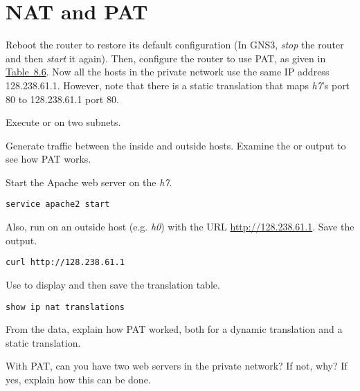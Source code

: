 \documentclass{../UTNetLab}
\begin{document}
\section{NAT and PAT}
Reboot the router to restore its default configuration (In GNS3, \textit{stop} the router and then \textit{start} it again).
Then, configure the router to use PAT, as given in \hyperref[tab:8.6]{Table~8.6}.
Now all the hosts in the private network use the same IP address 128.238.61.1.
However, note that there is a static translation that maps \textit{h7}’s port 80 to 128.238.61.1 port 80.

Execute  or  on two subnets.

Generate traffic between the inside and outside hosts.
Examine the  or  output to see how PAT works.

Start the Apache web server on the \textit{h7}.

\begin{lstlisting}
service apache2 start
\end{lstlisting}

Also, run  on an outside host (e.g. \textit{h0}) with the URL \url{http://128.238.61.1}.
Save the  output.

\begin{lstlisting}
curl http://128.238.61.1
\end{lstlisting}

Use  to display and then save the translation table.

\begin{lstlisting}[language=cisco, frame=trBL]
show ip nat translations
\end{lstlisting}

\begin{report}
    \item From the  data, explain how PAT worked, both for a dynamic translation and a static translation.

    \item With PAT, can you have two web servers in the private network?
    If not, why?
    If yes, explain how this can be done.
\end{report}
\end{document}
